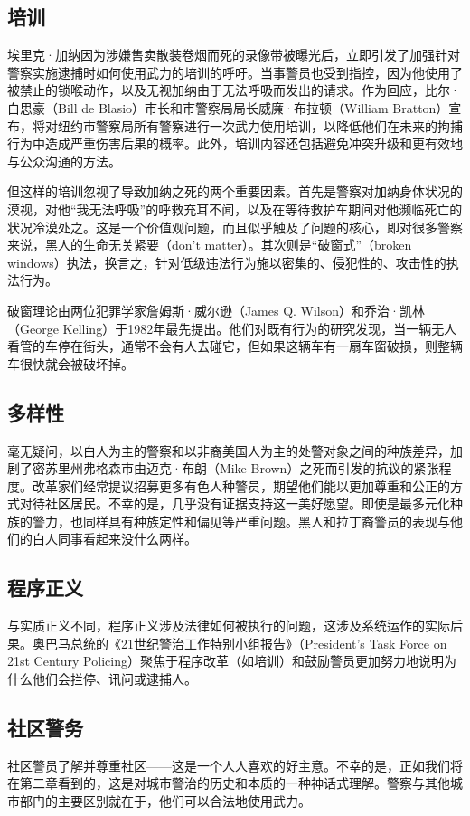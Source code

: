 \documentclass[fontset=fandol, a4paper, 12pt, openright]{ctexbook}
\begin{document}
\subsection{培训}
埃里克·加纳因为涉嫌售卖散装卷烟而死的录像带被曝光后，立即引发了加强针对警察实施逮捕时如何使用武力的培训的呼吁。当事警员也受到指控，因为他使用了被禁止的锁喉动作，以及无视加纳由于无法呼吸而发出的请求。作为回应，比尔·白思豪（Bill de Blasio）市长和市警察局局长威廉·布拉顿（William Bratton）宣布，将对纽约市警察局所有警察进行一次武力使用培训，以降低他们在未来的拘捕行为中造成严重伤害后果的概率。此外，培训内容还包括避免冲突升级和更有效地与公众沟通的方法。

但这样的培训忽视了导致加纳之死的两个重要因素。首先是警察对加纳身体状况的漠视，对他“我无法呼吸”的呼救充耳不闻，以及在等待救护车期间对他濒临死亡的状况冷漠处之。这是一个价值观问题，而且似乎触及了问题的核心，即对很多警察来说，黑人的生命无关紧要（don't matter）。其次则是“破窗式”（broken windows）执法，换言之，针对低级违法行为施以密集的、侵犯性的、攻击性的执法行为。

破窗理论由两位犯罪学家詹姆斯·威尔逊（James Q. Wilson）和乔治·凯林（George Kelling）于1982年最先提出。他们对既有行为的研究发现，当一辆无人看管的车停在街头，通常不会有人去碰它，但如果这辆车有一扇车窗破损，则整辆车很快就会被破坏掉。

\subsection{多样性}
毫无疑问，以白人为主的警察和以非裔美国人为主的处警对象之间的种族差异，加剧了密苏里州弗格森市由迈克·布朗（Mike Brown）之死而引发的抗议的紧张程度。改革家们经常提议招募更多有色人种警员，期望他们能以更加尊重和公正的方式对待社区居民。不幸的是，几乎没有证据支持这一美好愿望。即使是最多元化种族的警力，也同样具有种族定性和偏见等严重问题。黑人和拉丁裔警员的表现与他们的白人同事看起来没什么两样。

\subsection{程序正义}
与实质正义不同，程序正义涉及法律如何被执行的问题，这涉及系统运作的实际后果。奥巴马总统的《21世纪警治工作特别小组报告》（President's Task Force on 21st Century Policing）聚焦于程序改革（如培训）和鼓励警员更加努力地说明为什么他们会拦停、讯问或逮捕人。

\subsection{社区警务}
社区警员了解并尊重社区——这是一个人人喜欢的好主意。不幸的是，正如我们将在第二章看到的，这是对城市警治的历史和本质的一种神话式理解。警察与其他城市部门的主要区别就在于，他们可以合法地使用武力。
\end{document}
